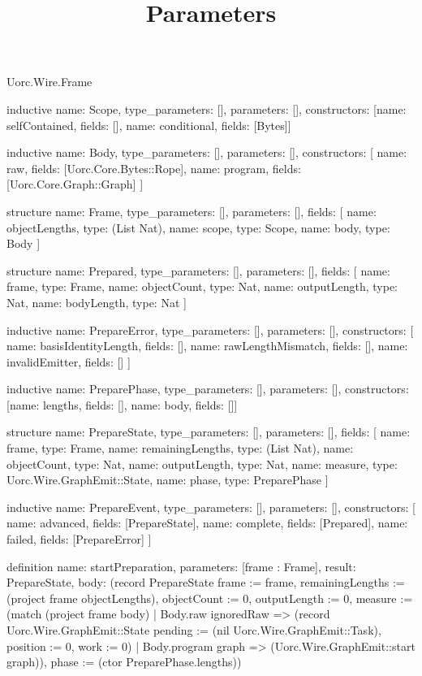 \begin{lexlean}{Uorc.Wire.Frame}
\title{Parameters}
\begin{semanticmodule}
inductive{
  name: Scope,
  type_parameters: [],
  parameters: [],
  constructors: [{name: selfContained, fields: []}, {name: conditional, fields: [Bytes]}]
}

inductive{
  name: Body,
  type_parameters: [],
  parameters: [],
  constructors: [
    {name: raw, fields: [Uorc.Core.Bytes::Rope]},
    {name: program, fields: [Uorc.Core.Graph::Graph]}
  ]
}

structure{
  name: Frame,
  type_parameters: [],
  parameters: [],
  fields: [
    {name: objectLengths, type: (List Nat)},
    {name: scope, type: Scope},
    {name: body, type: Body}
  ]
}

structure{
  name: Prepared,
  type_parameters: [],
  parameters: [],
  fields: [
    {name: frame, type: Frame},
    {name: objectCount, type: Nat},
    {name: outputLength, type: Nat},
    {name: bodyLength, type: Nat}
  ]
}

inductive{
  name: PrepareError,
  type_parameters: [],
  parameters: [],
  constructors: [
    {name: basisIdentityLength, fields: []},
    {name: rawLengthMismatch, fields: []},
    {name: invalidEmitter, fields: []}
  ]
}

inductive{
  name: PreparePhase,
  type_parameters: [],
  parameters: [],
  constructors: [{name: lengths, fields: []}, {name: body, fields: []}]
}

structure{
  name: PrepareState,
  type_parameters: [],
  parameters: [],
  fields: [
    {name: frame, type: Frame},
    {name: remainingLengths, type: (List Nat)},
    {name: objectCount, type: Nat},
    {name: outputLength, type: Nat},
    {name: measure, type: Uorc.Wire.GraphEmit::State},
    {name: phase, type: PreparePhase}
  ]
}

inductive{
  name: PrepareEvent,
  type_parameters: [],
  parameters: [],
  constructors: [
    {name: advanced, fields: [PrepareState]},
    {name: complete, fields: [Prepared]},
    {name: failed, fields: [PrepareError]}
  ]
}

definition{
  name: startPreparation,
  parameters: [frame : Frame],
  result: PrepareState,
  body: (record PrepareState {frame := frame, remainingLengths := (project frame objectLengths), objectCount := 0, outputLength := 0, measure := (match (project frame body)
    | Body.raw ignoredRaw => (record Uorc.Wire.GraphEmit::State {pending := (nil Uorc.Wire.GraphEmit::Task), position := 0, work := 0})
    | Body.program graph => (Uorc.Wire.GraphEmit::start graph)), phase := (ctor PreparePhase.lengths)})
}


\end{semanticmodule}
\end{lexlean}
